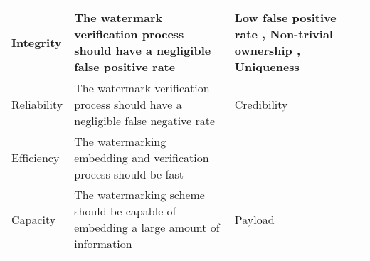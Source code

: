\begin{table*}[t]
\begin{tabular}{|p{}|p{}|p{}|}
%
Integrity                       & The watermark verification process should have a negligible false positive rate                                   & Low false positive rate \cite{guo_evolutionary_2019, guo_watermarking_2018}, Non-trivial ownership \cite{li_piracy_2020, adi_turning_2018, wang_robust_2020}, Uniqueness \cite{quan_watermarking_2020} \\ \hline
%
Reliability                     & The watermark verification process should have a negligible false negative rate                                   & Credibility \cite{chen_blackmarks_2019}                                                \\ \hline
%
Efficiency                      & The watermarking embedding and verification process should be fast                                                &                                                            \\ \hline
%
Capacity                        & The watermarking scheme should be capable of embedding a large amount of information                              & Payload \cite{guo_watermarking_2018}                                                    \\ \hline
%



\end{tabular}
\end{table*}
